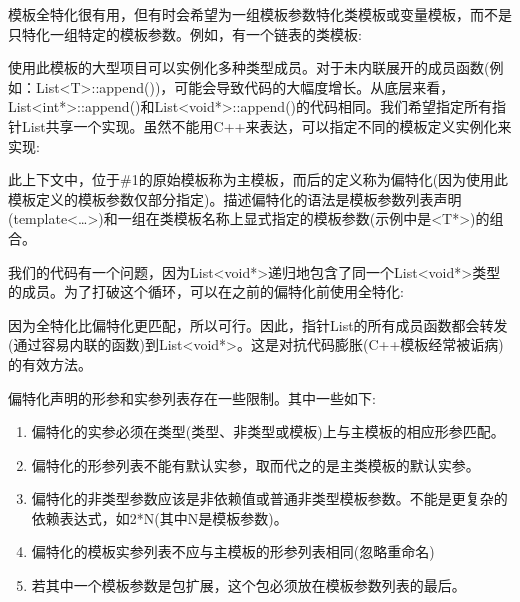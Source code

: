
模板全特化很有用，但有时会希望为一组模板参数特化类模板或变量模板，而不是只特化一组特定的模板参数。例如，有一个链表的类模板:


使用此模板的大型项目可以实例化多种类型成员。对于未内联展开的成员函数(例如：List<T>::append())，可能会导致代码的大幅度增长。从底层来看，List<int*>::append()和List<void*>::append()的代码相同。我们希望指定所有指针List共享一个实现。虽然不能用C++来表达，可以指定不同的模板定义实例化来实现:


此上下文中，位于\#1的原始模板称为主模板，而后的定义称为偏特化(因为使用此模板定义的模板参数仅部分指定)。描述偏特化的语法是模板参数列表声明(template<…>)和一组在类模板名称上显式指定的模板参数(示例中是<T*>)的组合。

我们的代码有一个问题，因为List<void*>递归地包含了同一个List<void*>类型的成员。为了打破这个循环，可以在之前的偏特化前使用全特化:


因为全特化比偏特化更匹配，所以可行。因此，指针List的所有成员函数都会转发(通过容易内联的函数)到List<void*>。这是对抗代码膨胀(C++模板经常被诟病)的有效方法。

偏特化声明的形参和实参列表存在一些限制。其中一些如下:

\begin{enumerate}
\item 
偏特化的实参必须在类型(类型、非类型或模板)上与主模板的相应形参匹配。

\item 
偏特化的形参列表不能有默认实参，取而代之的是主类模板的默认实参。

\item 
偏特化的非类型参数应该是非依赖值或普通非类型模板参数。不能是更复杂的依赖表达式，如2*N(其中N是模板参数)。

\item 
偏特化的模板实参列表不应与主模板的形参列表相同(忽略重命名)

\item 
若其中一个模板参数是包扩展，这个包必须放在模板参数列表的最后。
\end{enumerate}

